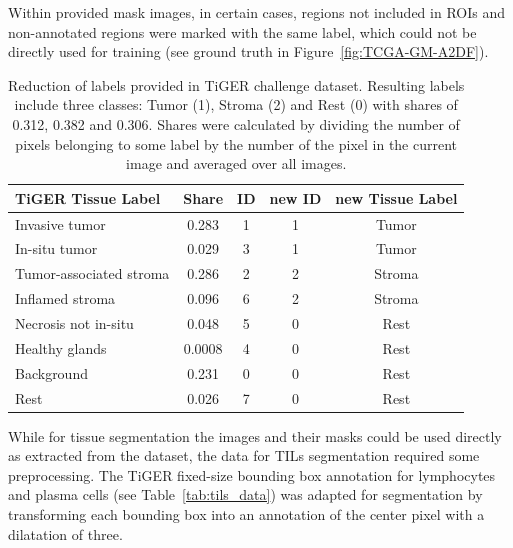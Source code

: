 Within provided mask images, in certain cases, regions not included in ROIs and non-annotated regions were marked with the same label, which could not be directly used for training (see ground truth in Figure~\ref*{fig:TCGA-GM-A2DF}).
\begin{table}[h!]
\centering
\begin{tabular}{ l c c c c } 
\hline
TiGER Tissue Label & Share & ID & new ID & new Tissue Label \\ 
\hline
Invasive tumor & 0.283 & 1 & 1 & Tumor\\ 
In-situ tumor & 0.029 & 3 & 1 & Tumor\\ 
Tumor-associated stroma & 0.286 & 2 & 2 & Stroma\\
Inflamed stroma & 0.096 & 6 & 2 & Stroma\\
Necrosis not in-situ & 0.048 & 5 & 0 & Rest\\
Healthy glands & 0.0008 & 4 & 0 & Rest\\ 
Background & 0.231 & 0 & 0 & Rest\\ 
Rest & 0.026 & 7 & 0 & Rest\\
\hline
\end{tabular}
\caption{\label{tab:label_data} Reduction of labels provided in TiGER challenge dataset. Resulting labels include three classes: Tumor (1), Stroma (2) and Rest (0) with shares of 0.312, 0.382 and 0.306. Shares were calculated by dividing
the number of pixels belonging to some label by the number of the pixel in the current image and averaged over all images. }
\end{table}
While for tissue segmentation the images and their masks could be used directly as extracted from the dataset, the data for TILs segmentation required some preprocessing.
The TiGER fixed-size bounding box annotation for lymphocytes and plasma cells (see Table~\ref{tab:tils_data}) was adapted for segmentation by transforming each bounding box into an annotation of the center pixel with a dilatation of three.
